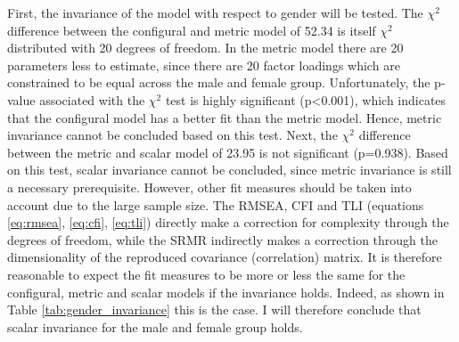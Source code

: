 \documentclass[11pt]{article}
\begin{document}
\begin{table}[h]
\captionsetup{singlelinecheck=off}
\caption{Gender measurement invariance}
\label{tab:gender_invariance}
\end{table}

First, the invariance of the model with respect to gender will be tested. The
$\chi^2$ difference between the configural and metric model of 52.34 is itself
$\chi^2$ distributed with 20 degrees of freedom. In the metric model there are
20 parameters less to estimate, since there are 20 factor loadings which are
constrained to be equal across the male and female group. Unfortunately, the
p-value associated with the $\chi^2$ test is highly significant (p<0.001), which
indicates that the configural model has a better fit than the metric model. Hence,
metric invariance cannot be concluded based on this test. Next, the $\chi^2$
difference between the metric and scalar model of 23.95 is not significant
(p=0.938). Based on this test, scalar invariance cannot be concluded, since metric
invariance is still a necessary prerequisite. However, other fit measures should
be taken into account due to the large sample size. The RMSEA, CFI and TLI
(equations \ref{eq:rmsea}, \ref{eq:cfi}, \ref{eq:tli}) directly make a correction
for complexity through the degrees of freedom, while the SRMR indirectly makes a
correction through the dimensionality of the reproduced covariance (correlation)
matrix. It is therefore reasonable to expect the fit measures to be more or less
the same for the configural, metric and scalar models if the invariance holds.
Indeed, as shown in Table \ref{tab:gender_invariance} this is the case. I will
therefore conclude that scalar invariance for the male and female group holds.
\end{document}
